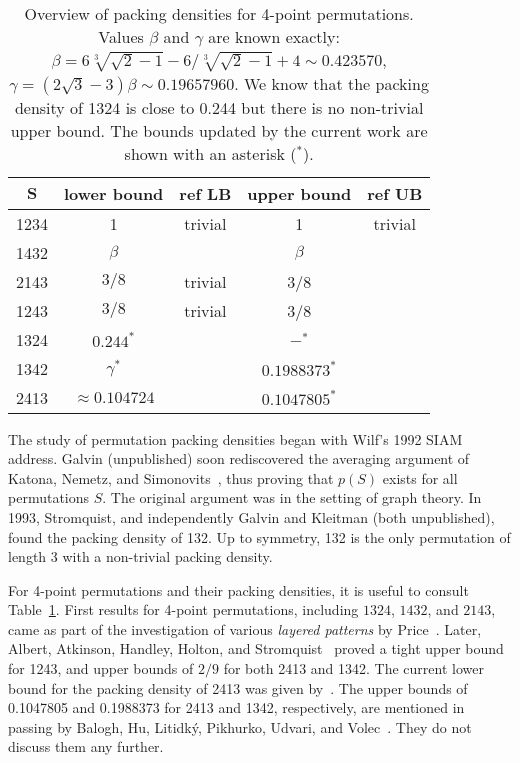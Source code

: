 \documentclass[12pt, a4paper, twoside]{report}
\begin{document}
\begin{table}[ht]
\centering
\begin{tabular}{|c | c | c | c | c|}
\hline
$\mathbf{S}$ & \textbf{lower bound} & \textbf{ref LB} & \textbf{upper bound} & \textbf{ref UB}\\
\hline\hline
1234 & 1 & trivial & 1 & trivial\\
\hline
1432 & $\beta$ & \cite{price1997packing} & $\beta$ & \cite{price1997packing}\\
\hline
2143 & $3/8$ & trivial & 3/8 & \cite{price1997packing}\\
\hline
1243 & $3/8$ & trivial & 3/8 & \cite{albert2002packing}\\
\hline
1324 & $0.244^*$ & \cite{price1997packing} & $ -^* $ & \cite{price1997packing}\\
\hline
1342 & $\gamma^*$ & \cite{batkeyev} & $0.1988373^*$ & \cite{balogh2015minimum}\\
\hline
2413 & $\approx 0.104724$ & \cite{presutti2010packing} & $0.1047805^*$ & \cite{balogh2015minimum}\\
\hline
\end{tabular}
\caption{\small{Overview of packing densities for 4-point permutations. Values $\beta$ and $\gamma$ are known exactly: $\beta = 6\sqrt[3]{\sqrt{2}-1}-6/\sqrt[3]{\sqrt{2}-1}+4 \sim 0.423570$, $\gamma = (2\sqrt{3}-3)\beta \sim 0.19657960$. We know that the packing density of 1324 is close to 0.244 but there is no non-trivial upper bound. The bounds updated by the current work are shown with an asterisk (${}^*$).}}
\label{tab:overview}
\end{table}

The study of permutation packing densities began with Wilf's 1992 SIAM address. Galvin (unpublished) soon rediscovered the averaging argument of Katona, Nemetz, and Simonovits~\cite{katona1964exists}, thus proving that $p(S)$ exists for all permutations $S$. The original argument was in the setting of graph theory. In 1993, Stromquist, and independently Galvin and Kleitman (both unpublished), found the packing density of 132. Up to symmetry, 132 is the only permutation of length 3 with a non-trivial packing density.

For 4-point permutations and their packing densities, it is useful to consult Table~\ref{tab:overview}. First results for 4-point permutations, including $1324$, $1432$, and $2143$, came as part of the investigation of various \emph{layered patterns} by Price~\cite{price1997packing}. Later, Albert, Atkinson, Handley, Holton, and Stromquist~\cite{albert2002packing} proved a tight upper bound for 1243, and upper bounds of $2/9$ for both 2413 and 1342. The current lower bound for the packing density of 2413 was given by~\cite{presutti2010packing}. The upper bounds of 0.1047805 and 0.1988373 for 2413 and 1342, respectively, are mentioned in passing by Balogh, Hu, Litidk\'y, Pikhurko, Udvari, and Volec~\cite{balogh2015minimum}. They do not discuss them any further.
\end{document}
